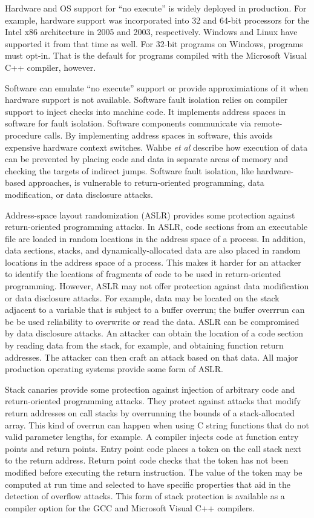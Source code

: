 Hardware and OS support for ``no execute'' is widely deployed in production.
For example, hardware support was incorporated into 32 and 64-bit processors
for the Intel x86 architecture in 2005 and 2003, respectively.  Windows
and Linux have supported it from that time as well.  For 32-bit programs on
Windows, programs must opt-in.  That is the default for programs compiled
with the Microsoft Visual C++ compiler, however.

Software can emulate ``no execute'' support or provide approximiations of it
when hardware support is not available. Software fault isolation
\cite{Wahbe1993} relies on compiler support to inject checks into machine code.
It implements address spaces in software  for fault isolation. Software components communicate via remote-procedure calls. By implementing address
spaces in software, this avoids expensive hardware context switches.
Wahbe {\it et al} \cite{Wahbe1993} describe how execution of data can be
prevented by placing code and data in separate areas of memory and checking the
targets of  indirect jumps.  Software fault isolation, like hardware-based
approaches,  is vulnerable to return-oriented programming, data modification, 
or data disclosure attacks.

Address-space layout randomization (ASLR) \cite{PaX2003,WikipediaASLR} provides
some protection against return-oriented programming attacks.  In ASLR, code
sections from an executable file are loaded in random locations in the
address space of a process.  In addition, data sections, stacks, and
dynamically-allocated data are also placed in random locations in the address
space of a process. This makes it harder for an attacker to identify the locations of fragments of code to be used in return-oriented programming.  However, ASLR may not offer protection against data modification or data disclosure attacks. For example, data may be located on the stack adjacent to a
variable that is subject to a buffer overrun; the buffer overrrun can be
be used reliability to overwrite or read the data.   ASLR can be compromised by
data disclosure attacks.  An attacker can obtain the location of a code section by reading data from the stack, for example, and obtaining function return
addresses.     The attacker can then craft an attack based on that data.  
All major production operating systems provide some form of ASLR.

Stack canaries \cite{Cowan1998} provide some protection against injection of 
arbitrary code and return-oriented programming attacks.
They protect against attacks that modify return addresses
on call stacks by overrunning the bounds of a stack-allocated array.  
This kind of overrun can happen when using C string functions that do
not valid parameter lengths, for example.   A
compiler injects code at function entry points and return
points. Entry point code places a token on the call stack
next to the return address.  Return point code checks that
the token has not been modified before executing the return
instruction.  The value of the token may be computed at run time
and selected to have specific properties that aid in the detection
of overflow attacks.  This form of stack protection is available as a
compiler option for the GCC and Microsoft Visual C++ compilers.

